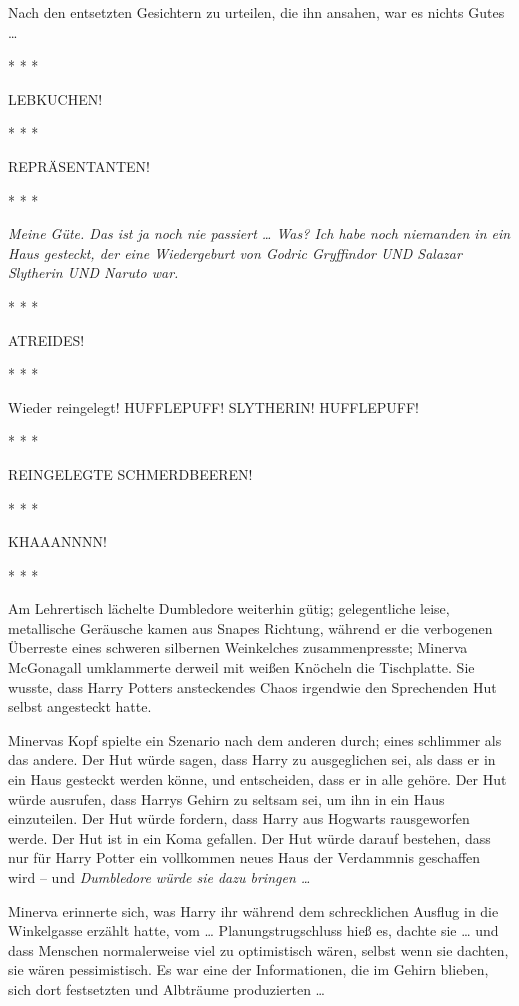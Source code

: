 Nach den entsetzten Gesichtern zu urteilen, die ihn ansahen, war es nichts Gutes
…

* * *

\glqq{}LEBKUCHEN!\grqq{}

* * *

\glqq{}REPRÄSENTANTEN!\grqq{}

* * *

\emph{\glqq{}Meine Güte. Das ist ja noch nie passiert …\grqq{}
Was? \glqq{}Ich habe noch niemanden in ein Haus gesteckt, der eine Wiedergeburt
von Godric Gryffindor UND Salazar Slytherin UND Naruto war.\grqq{}}

* * *

\glqq{}ATREIDES!\grqq{}

* * *

\glqq{}Wieder reingelegt! HUFFLEPUFF! SLYTHERIN! HUFFLEPUFF!\grqq{}

* * *

\glqq{}REINGELEGTE SCHMERDBEEREN!\grqq{}

* * *

\glqq{}KHAAANNNN!\grqq{}

* * *

Am Lehrertisch lächelte Dumbledore weiterhin gütig; gelegentliche leise,
metallische Geräusche kamen aus Snapes Richtung, während er die verbogenen
Überreste eines schweren silbernen Weinkelches zusammenpresste; Minerva
McGonagall umklammerte derweil mit weißen Knöcheln die Tischplatte. Sie wusste,
dass Harry Potters ansteckendes Chaos irgendwie den Sprechenden Hut selbst
angesteckt hatte.

Minervas Kopf spielte ein Szenario nach dem anderen durch; eines schlimmer als
das andere. Der Hut würde sagen, dass Harry zu ausgeglichen sei, als dass er in
ein Haus gesteckt werden könne, und entscheiden, dass er in alle gehöre. Der Hut
würde ausrufen, dass Harrys Gehirn zu seltsam sei, um ihn in ein Haus
einzuteilen. Der Hut würde fordern, dass Harry aus Hogwarts rausgeworfen werde.
Der Hut ist in ein Koma gefallen. Der Hut würde darauf bestehen, dass nur für
Harry Potter ein vollkommen neues Haus der Verdammnis geschaffen wird – und
\emph{Dumbledore würde sie dazu bringen …}

Minerva erinnerte sich, was Harry ihr während dem schrecklichen Ausflug in die
Winkelgasse erzählt hatte, vom … Planungstrugschluss hieß es, dachte sie … und
dass Menschen normalerweise viel zu optimistisch wären, selbst wenn sie dachten,
sie wären pessimistisch. Es war eine der Informationen, die im Gehirn blieben,
sich dort festsetzten und Albträume produzierten …

